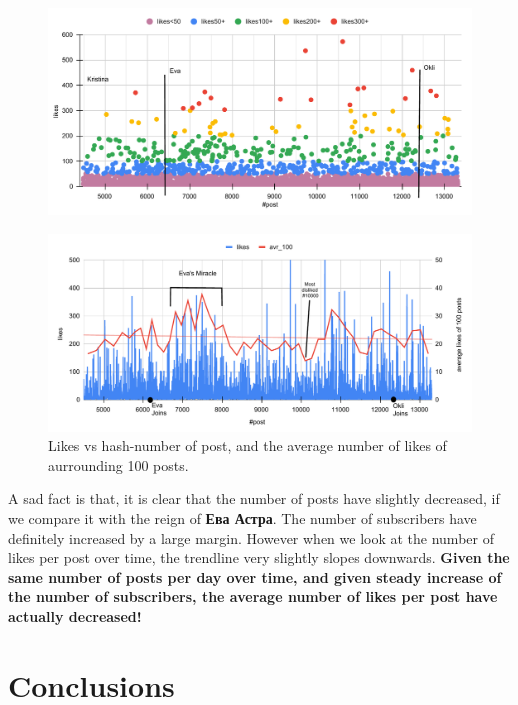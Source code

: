 \documentclass[
	12pt
] {article}
\begin{document}
	
	\begin{figure}[H]
		\centering
		\includegraphics[width=1\textwidth]{fig-likes-mega-likes-vs-post-n}
		\caption{}
		\label{fig-likes-mega-likes-vs-post-n}
	\end{figure}
	
	\begin{figure}[H]
		\centering
		\includegraphics[width=1\textwidth]{fig-likes-vs-post-moving-average}
		\caption{Likes vs hash-number of post, and the average number of likes of aurrounding 100 posts.}
		\label{fig-likes-vs-post-moving-average}
	\end{figure}
	
	A sad fact is that, it is clear that the number of posts have slightly decreased, if we compare it with the reign of \textbf{Ева Астра}. The number of subscribers have definitely increased by a large margin. However when we look at the number of likes per post over time, the trendline very slightly slopes downwards. \textbf{Given the same number of posts per day over time, and given steady increase of the number of subscribers, the average number of likes per post have actually decreased!}
	
\section{Conclusions}



\end{document}
